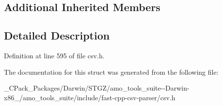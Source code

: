 \subsection*{Additional Inherited Members}


\subsection{Detailed Description}


Definition at line 595 of file csv.\+h.



The documentation for this struct was generated from the following file\+:\begin{DoxyCompactItemize}
\item 
\+\_\+\+C\+Pack\+\_\+\+Packages/\+Darwin/\+S\+T\+G\+Z/amo\+\_\+tools\+\_\+suite-\/-\/\+Darwin-\/x86\+\_/amo\+\_\+tools\+\_\+suite/include/fast-\/cpp-\/csv-\/parser/csv.\+h\end{DoxyCompactItemize}

